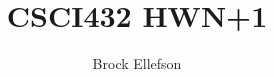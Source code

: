 \documentclass[10pt,a4paper]{article}
\author{Brock Ellefson}
\title{CSCI432 HWN+1}
\begin{document}
\maketitle
\doublespacing
\end{document}
